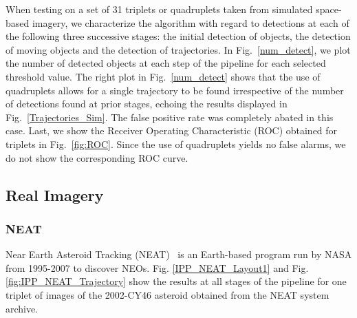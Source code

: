 When testing on a set of 31 triplets or quadruplets taken from simulated space-based imagery, we characterize the algorithm with regard to detections at each of the following three successive stages: the initial detection of objects, the detection of moving objects and the detection of trajectories.
In Fig.~\ref{num_detect}, we plot the number of detected objects at each step of the pipeline for each selected threshold value. 
The right plot in Fig.~\ref{num_detect} shows that the use of quadruplets allows for a single trajectory to be found irrespective of the number of detections found at prior stages, 
echoing the results displayed in Fig.~\ref{Trajectories_Sim}. The false positive rate was completely abated in this case.
%
Last, we show the Receiver Operating Characteristic (ROC) obtained for triplets in Fig.~\ref{fig:ROC}.   
Since the use of quadruplets yields no false alarms, we do not show the corresponding ROC curve.

%
\vspace{-0.4cm}
\subsection{Real Imagery}

\subsubsection{NEAT}
Near Earth Asteroid Tracking (NEAT)~\cite{neat2014} is an Earth-based program run by NASA from 1995-2007 to discover NEOs.
Fig. \ref{IPP_NEAT_Layout1} and Fig. \ref{fig:IPP_NEAT_Trajectory} show the results at all stages of the pipeline for one triplet of images of the 2002-CY46 asteroid obtained from the NEAT system archive. 
 
